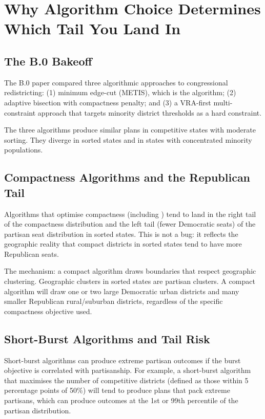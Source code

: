 \section{Why Algorithm Choice Determines Which Tail You Land In}
\label{sec:algorithm-choice}

\subsection{The B.0 Bakeoff}

The B.0 paper \citep{dellaLibera2026b0} compared three algorithmic approaches
to congressional redistricting: (1) minimum edge-cut (METIS), which is the
\ar{} algorithm; (2) adaptive bisection with compactness penalty; and
(3) a VRA-first multi-constraint approach that targets minority district
thresholds as a hard constraint.

The three algorithms produce similar plans in competitive states with moderate
sorting.  They diverge in sorted states and in states with concentrated
minority populations.

\subsection{Compactness Algorithms and the Republican Tail}

Algorithms that optimise compactness (including \ar{}) tend to land in
the right tail of the compactness distribution and the left tail (fewer
Democratic seats) of the partisan seat distribution in sorted states.
This is not a bug: it reflects the geographic reality that compact districts
in sorted states tend to have more Republican seats.

The mechanism: a compact algorithm draws boundaries that respect geographic
clustering.  Geographic clusters in sorted states are partisan clusters.
A compact algorithm will draw one or two large Democratic urban districts
and many smaller Republican rural/suburban districts, regardless of the
specific compactness objective used.

\subsection{Short-Burst Algorithms and Tail Risk}

Short-burst algorithms \citep{cannon2022voting} can produce extreme partisan
outcomes if the burst objective is correlated with partisanship.  For example,
a short-burst algorithm that maximises the number of competitive districts
(defined as those within 5 percentage points of 50\%) will tend to produce
plans that pack extreme partisans, which can produce outcomes at the
1st or 99th percentile of the partisan distribution.

